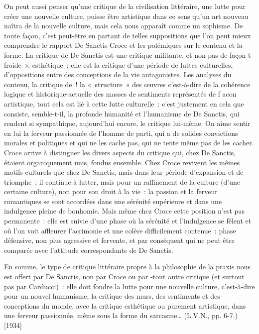 \documentclass[french,twoside]{book} %
\begin{document}
On peut aussi penser qu’une critique de la civilisation littéraire, une lutte pour créer une nouvelle culture, puisse être artistique dans ce sens qu’un art nouveau naîtra de la nouvelle culture, mais cela nous apparaît comme un sophisme. De toute façon, c’est peut-être en partant de telles suppositions que l’on peut mieux comprendre le rapport De Sanctis-Croce et les polémiques sur le contenu et la forme. La critique de De Sanctis est une critique militante, et non pas de façon t froide », esthétique ; elle est la critique d’une période de luttes culturelles, d’oppositions entre des conceptions de la vie antagonistes. Les analyses du contenu, la critique de ! la « structure » des œuvres c’est-à-dire de la cohérence logique et historique-actuelle des masses de sentiments représentés de f acon artistique, tout cela est lié à cette lutte culturelle : c’est justement en cela que consiste, semble-t-il, la profonde humanité et l’humanisme de De Sanctis, qui rendent si sympathique, aujourd’hui encore, le critique lui-même. On aime sentir en lui la ferveur passionnée de l’homme de parti, qui a de solides convictions morales et politiques et qui ne les cache pas, qui ne tente même pas de les cacher. Croce arrive à distinguer les divers aspects du critique qui, chez De Sanctis, étaient organiquement unis, fondus ensemble. Chez Croce revivent les mêmes motifs culturels que chez De Sanctis, mais dans leur période d’expansion et de triomphe ; il continue à lutter, mais pour un raffinement de la culture (d’une certaine culture), non pour son droit à la vie : la passion et la ferveur romantiques se sont accordées dans une sérénité supérieure et dans une indulgence pleine de bonhomie. Mais même chez Croce cette position n’est pas permanente : elle est suivie d’une phase où la sérénité et l’indulgence se fêlent et où l’on voit affleurer l’acrimonie et une colère difficilement contenue : phase défensive, non plus agressive et fervente, et par conséquent qui ne peut être comparée avec l’attitude correspondante de De Sanctis.\par
En somme, le type de critique littéraire propre à la philosophie de la praxis nous est offert par De Sanctis, non par Croce ou par -tout autre critique (et surtout pas par Carducci) : elle doit fondre la lutte pour une nouvelle culture, c’est-à-dire pour un nouvel humanisme, la critique des murs, des sentiments et des conceptions du monde, avec la critique esthétique ou purement artistique, dans une ferveur passionnée, même sous la forme du sarcasme… (L.V.N., pp. 6-7.) [1934]\par
\end{document}
